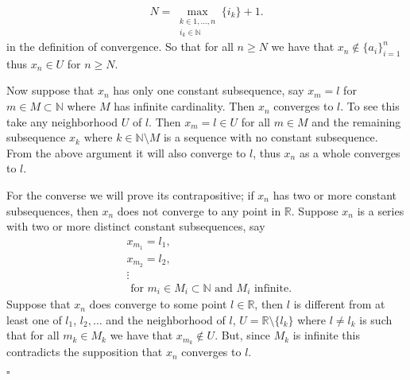 \documentclass[11pt, oneside]{article}   	%
\newcommand{\R}{\mathbb{R}}
\newcommand{\bb}[1]{\mathbb{#1}}
\newcommand{\tand}{\text{ and }}
\newcommand{\twhere}{\text{ where }}
\newcommand{\tfor}{\text{ for }}
\begin{document}
\[
N = \max_{\substack{k \in 1,\dots, n \\ i_k \in \bb{N}}} \{i_k\} + 1.
\]
 in the definition of convergence. So that for all $n \geq N$ we have that $x_n \not \in \{a_i\}_{i=1}^n$ thus $x_n \in U$ for $n \geq N$.
 
 Now suppose that $x_n$ has only one constant subsequence, say $x_m = l$ for $m \in M \subset \bb{N}$ where $M$ has infinite cardinality. Then $x_n$ converges to $l$. To see this take any neighborhood $U$ of $l$. Then $x_m = l \in U$ for all $m \in M$ and the remaining subsequence $x_k \twhere k \in \bb{N} \setminus M$ is a sequence with no constant subsequence. From the above argument it will also converge to $l$, thus $x_n$ as a whole converges to $l$.
 
 For the converse we will prove its contrapositive; if $x_n$ has two or more constant subsequences, then $x_n$ does not converge to any point in $\R$. Suppose $x_n$ is a series with two or more distinct constant subsequences, say
 \begin{eqnarray*}
&x_{m_1} = l_1,\\
&x_{m_2} = l_2, \\
&\vdots \\
&\tfor m_i \in M_i \subset \bb{N} \tand M_i \text{ infinite. }
\end{eqnarray*}
Suppose that $x_n$ does converge to some point $l \in \R$, then $l$ is different from at least one of $l_1$, $l_2, \dots$ and the neighborhood of $l$, $U = \R \setminus \{l_k\}$ where $l \neq l_k$ is such that for all $m_k \in M_k$ we have that  $x_{m_k} \not \in U$. But, since $M_k$ is infinite this  contradicts the supposition that $x_n$ converges to $l$.

 \begin{center}
 $\square$
 \end{center}
 
\end{document}
